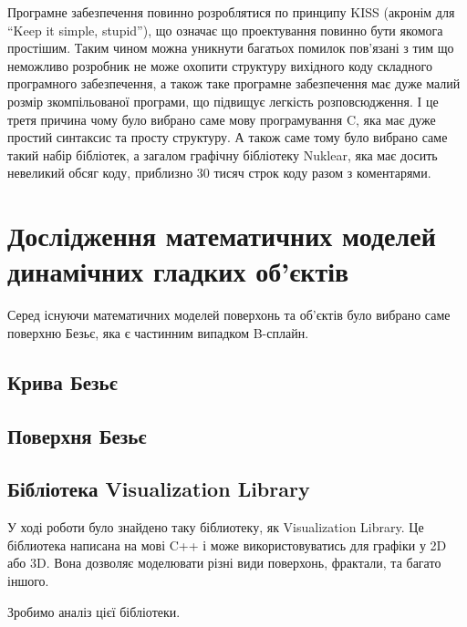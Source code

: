 \documentclass[14pt,a4paper]{extarticle}
\theoremstyle{definition}
\begin{document}
\begin{itemize}
Програмне забезпечення повинно розроблятися по принципу KISS (акронім для ``Keep it simple, stupid''), що означає що проектування повинно бути якомога простішим. Таким чином можна уникнути багатьох помилок пов'язані з тим що неможливо розробник не може охопити структуру вихідного коду складного програмного забезпечення, а також таке програмне забезпечення має дуже малий розмір зкомпільованої програми, що підвищує легкість розповсюдження. І це третя причина чому було вибрано саме мову програмування C, яка має дуже простий синтаксис та просту структуру. А також саме тому було вибрано саме такий набір бібліотек, а загалом графічну бібліотеку Nuklear, яка має досить невеликий обсяг коду, приблизно 30 тисяч строк коду разом з коментарями.
\end{itemize}


\section{Дослідження математичних моделей динамічних гладких об'єктів}

Серед існуючи математичних моделей поверхонь та об'єктів було вибрано саме поверхню Безьє, яка є частинним випадком B-сплайн.

\subsection{Крива Безьє}

\subsection{Поверхня Безьє}

\subsection{Бібліотека Visualization Library}

У ході роботи було знайдено таку біблиотеку, як Visualization Library. Це біблиотека написана на мові C++ і може використовуватись для графіки у 2D або 3D. Вона дозволяє моделювати різні види поверхонь, фрактали, та багато іншого.

Зробимо аналіз цієї бібліотеки.
\end{document}
